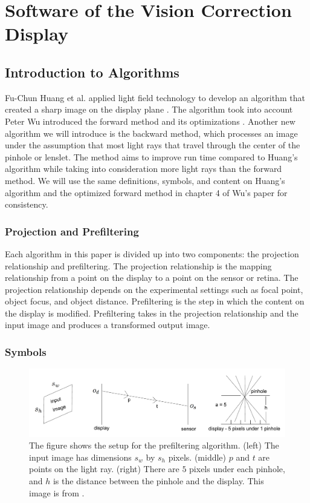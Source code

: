 \chapter{Software of the Vision Correction Display}

\section{Introduction to Algorithms}

Fu-Chun Huang et al. applied light field technology to develop an algorithm that created a sharp image on the display plane \cite{Huang:EECS-2013-206}. The algorithm took into account Peter Wu introduced the forward method and its optimizations \cite{Wu:EECS-2016-67}. Another new algorithm we will introduce is the backward method, which processes an image under the assumption that most light rays that travel through the center of the pinhole or lenslet. The method aims to improve run time compared to Huang's algorithm while taking into consideration more light rays than the forward method. We will use the same definitions, symbols, and content on Huang's algorithm and the optimized forward method in chapter 4 of Wu's paper \cite{Wu:EECS-2016-67} for consistency.

\subsection{Projection and Prefiltering}

Each algorithm in this paper is divided up into two components: the projection relationship and prefiltering. The projection relationship is the mapping relationship from a point on the display to a point on the sensor or retina. The projection relationship depends on the experimental settings such as focal point, object focus, and object distance. Prefiltering is the step in which the content on the display is modified. Prefiltering takes in the projection relationship and the input image and produces a transformed output image.

\subsection{Symbols}

\begin{figure}[ht]
  \centering
  \includegraphics[width=5.0in]{chapters/chapter4/images/Prefilter.png}
  \caption{The figure shows the setup for the prefiltering algorithm. (left) The input image has dimensions $s_w$ by $s_h$ pixels. (middle) $p$ and $t$ are points on the light ray. (right) There are $5$ pixels under each pinhole, and $h$ is the distance between the pinhole and the display. This image is from \cite{Wu:EECS-2016-67}.}
  \label{fig:fr}
\end{figure}


